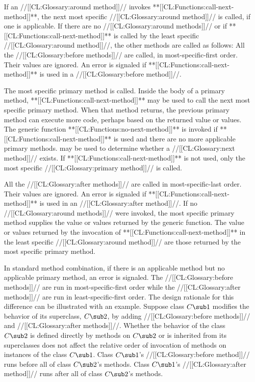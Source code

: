 \itemitem{\bull}  If an //[[CL:Glossary:around method]]// invokes **[[CL:Functions:call-next-method]]**, the next most specific //[[CL:Glossary:around method]]// is called, if one is applicable.  If there are no //[[CL:Glossary:around methods]]//  or if **[[CL:Functions:call-next-method]]** is called by the least specific //[[CL:Glossary:around method]]//, the other methods are called as follows: \beginlist \itemitem{--} All the //[[CL:Glossary:before methods]]// are called, in most-specific-first order.  Their values are ignored. An error is signaled if **[[CL:Functions:call-next-method]]** is used in a //[[CL:Glossary:before method]]//.

\itemitem{--} The most specific primary method is called.  Inside the body of a primary method, **[[CL:Functions:call-next-method]]** may be used to call the next most specific primary method.  When that method returns, the previous primary method can execute more code, perhaps based on the returned value or values.  The generic function **[[CL:Functions:no-next-method]]** is invoked if **[[CL:Functions:call-next-method]]** is used and there are no more applicable primary methods.   may be used to determine whether a //[[CL:Glossary:next method]]// exists.  If **[[CL:Functions:call-next-method]]** is not used, only the most specific //[[CL:Glossary:primary method]]// is called.

\itemitem{--} All the //[[CL:Glossary:after methods]]// are called in most-specific-last order.  Their values are ignored. An error is signaled if **[[CL:Functions:call-next-method]]** is used in an //[[CL:Glossary:after method]]//. \endlist \itemitem{\bull} If no //[[CL:Glossary:around methods]]// were invoked, the most specific primary method supplies the value or values returned by the generic function.  The value or values returned by the invocation of **[[CL:Functions:call-next-method]]** in the least specific //[[CL:Glossary:around method]]// are those returned by the most specific primary method.

\endlist

In standard method combination, if there is an applicable method but no applicable primary method, an error is signaled.
      The //[[CL:Glossary:before methods]]// are run in most-specific-first order while the //[[CL:Glossary:after methods]]// are run in least-specific-first order.  The design rationale for this difference can be illustrated with an example.  Suppose class $C\sub 1$ modifies the behavior of its superclass, $C\sub 2$, by adding //[[CL:Glossary:before methods]]// and //[[CL:Glossary:after methods]]//. Whether the behavior of the class $C\sub 2$ is defined directly by methods on $C\sub 2$ or is inherited from its superclasses does not affect the relative order of invocation of methods on instances of the class $C\sub 1$.  Class $C\sub 1$'s  //[[CL:Glossary:before method]]// runs before all of class $C\sub 2$'s methods.   Class $C\sub 1$'s //[[CL:Glossary:after method]]// runs after all of class $C\sub 2$'s methods.

